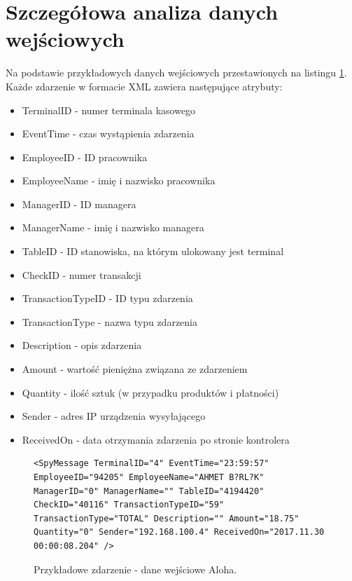 \documentclass[a4paper]{book}
\begin{document}
\section{Szczegółowa analiza danych wejściowych}
Na podstawie przykładowych danych wejściowych przestawionych na listingu \ref{lst:przykladoweZdarzenieAloha2}. Każde zdarzenie w formacie XML zawiera następujące atrybuty:
\begin{itemize}
	\item TerminalID - numer terminala kasowego
	\item EventTime - czas wystąpienia zdarzenia
	\item EmployeeID - ID pracownika
	\item EmployeeName - imię i nazwisko pracownika
	\item ManagerID - ID managera
	\item ManagerName - imię i nazwisko managera
	\item TableID - ID stanowiska, na którym ulokowany jest terminal
	\item CheckID - numer transakcji
	\item TransactionTypeID - ID typu zdarzenia
	\item TransactionType - nazwa typu zdarzenia
	\item Description - opis zdarzenia
	\item Amount - wartość pieniężna związana ze zdarzeniem
	\item Quantity - ilość sztuk (w przypadku produktów i płatności)
	\item Sender - adres IP urządzenia wysyłającego
	\item ReceivedOn - data otrzymania zdarzenia po stronie kontrolera
\end{itemize}
\begin{figure}[h]
	\begin{lstlisting}[frame=single, breaklines=true]
	<SpyMessage TerminalID="4" EventTime="23:59:57" EmployeeID="94205" EmployeeName="AHMET B?RL?K" ManagerID="0" ManagerName="" TableID="4194420" CheckID="40116" TransactionTypeID="59" TransactionType="TOTAL" Description="" Amount="18.75" Quantity="0" Sender="192.168.100.4" ReceivedOn="2017.11.30 00:00:08.204" />
	\end{lstlisting}
	\caption{Przykładowe zdarzenie - dane wejściowe Aloha.}
	\label{lst:przykladoweZdarzenieAloha2}
\end{figure}
\end{document}
